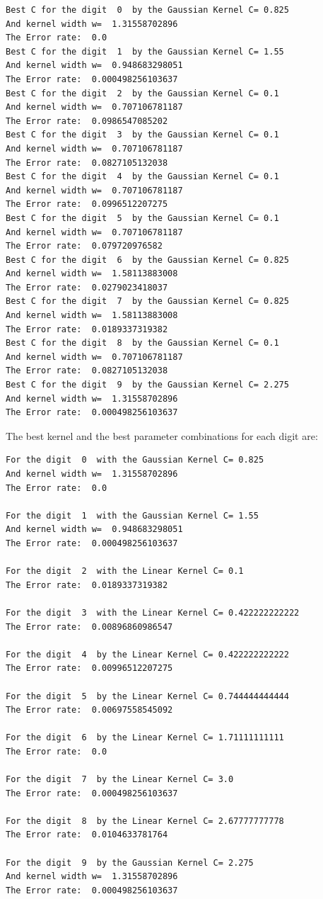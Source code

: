 \documentclass[a4paper,11pt]{article}
\begin{document}
\begin{verbatim}
Best C for the digit  0  by the Gaussian Kernel C= 0.825
And kernel width w=  1.31558702896
The Error rate:  0.0
Best C for the digit  1  by the Gaussian Kernel C= 1.55
And kernel width w=  0.948683298051
The Error rate:  0.000498256103637
Best C for the digit  2  by the Gaussian Kernel C= 0.1
And kernel width w=  0.707106781187
The Error rate:  0.0986547085202
Best C for the digit  3  by the Gaussian Kernel C= 0.1
And kernel width w=  0.707106781187
The Error rate:  0.0827105132038
Best C for the digit  4  by the Gaussian Kernel C= 0.1
And kernel width w=  0.707106781187
The Error rate:  0.0996512207275
Best C for the digit  5  by the Gaussian Kernel C= 0.1
And kernel width w=  0.707106781187
The Error rate:  0.079720976582
Best C for the digit  6  by the Gaussian Kernel C= 0.825
And kernel width w=  1.58113883008
The Error rate:  0.0279023418037
Best C for the digit  7  by the Gaussian Kernel C= 0.825
And kernel width w=  1.58113883008
The Error rate:  0.0189337319382
Best C for the digit  8  by the Gaussian Kernel C= 0.1
And kernel width w=  0.707106781187
The Error rate:  0.0827105132038
Best C for the digit  9  by the Gaussian Kernel C= 2.275
And kernel width w=  1.31558702896
The Error rate:  0.000498256103637
\end{verbatim}

The best kernel and the best parameter combinations for each digit are:

\begin{verbatim}
For the digit  0  with the Gaussian Kernel C= 0.825
And kernel width w=  1.31558702896
The Error rate:  0.0

For the digit  1  with the Gaussian Kernel C= 1.55
And kernel width w=  0.948683298051
The Error rate:  0.000498256103637

For the digit  2  with the Linear Kernel C= 0.1
The Error rate:  0.0189337319382

For the digit  3  with the Linear Kernel C= 0.422222222222
The Error rate:  0.00896860986547

For the digit  4  by the Linear Kernel C= 0.422222222222
The Error rate:  0.00996512207275

For the digit  5  by the Linear Kernel C= 0.744444444444
The Error rate:  0.00697558545092

For the digit  6  by the Linear Kernel C= 1.71111111111
The Error rate:  0.0

For the digit  7  by the Linear Kernel C= 3.0
The Error rate:  0.000498256103637

For the digit  8  by the Linear Kernel C= 2.67777777778
The Error rate:  0.0104633781764

For the digit  9  by the Gaussian Kernel C= 2.275
And kernel width w=  1.31558702896
The Error rate:  0.000498256103637
\end{verbatim}
\end{document}
